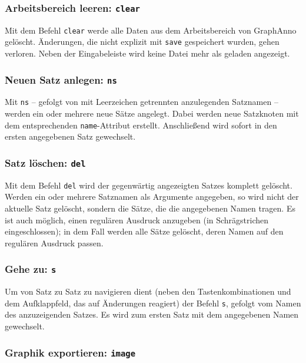 \documentclass[12pt]{scrartcl}
\begin{document}
\subsubsection{Arbeitsbereich leeren: \texttt{clear}}

Mit dem Befehl \texttt{clear} werde alle Daten aus dem Arbeitsbereich von GraphAnno gelöscht. Änderungen, die nicht explizit mit \texttt{save} gespeichert wurden, gehen verloren.
Neben der Eingabeleiste wird keine Datei mehr als geladen angezeigt.


\subsubsection{Neuen Satz anlegen: \texttt{ns}}\label{befehl-ns}

Mit \texttt{ns} – gefolgt von mit Leerzeichen getrennten anzulegenden Satznamen – werden ein oder mehrere neue Sätze angelegt. Dabei werden neue Satzknoten mit dem entsprechenden \texttt{name}-Attribut erstellt. Anschließend wird sofort in den ersten angegebenen Satz gewechselt.


\subsubsection{Satz löschen: \texttt{del}}

Mit dem Befehl \texttt{del} wird der gegenwärtig angezeigten Satzes komplett gelöscht.
Werden ein oder mehrere Satznamen als Argumente angegeben, so wird nicht der aktuelle Satz gelöscht, sondern die Sätze, die die angegebenen Namen tragen.
Es ist auch möglich, einen regulären Ausdruck anzugeben (in Schrägstrichen eingeschlossen); in dem Fall werden alle Sätze gelöscht, deren Namen auf den regulären Ausdruck passen.


\subsubsection{Gehe zu: \texttt{s}}

Um von Satz zu Satz zu navigieren dient (neben den Tastenkombinationen und dem Aufklappfeld, das auf Änderungen reagiert) der Befehl \texttt{s}, gefolgt vom Namen des anzuzeigenden Satzes. Es wird zum ersten Satz mit dem angegebenen Namen gewechselt.


\subsubsection{Graphik exportieren: \texttt{image}}
\end{document}
